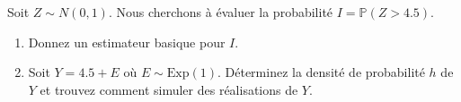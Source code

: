 \documentclass[11pt]{td_um}
\begin{document}
\begin{exo}{} %
    Soit $Z \sim N(0,1)$. Nous cherchons à évaluer la
    probabilité $I = \mathbb P(Z >4.5)$.
    \begin{enumerate}
        \item Donnez un estimateur basique pour $I$.
        \item Soit $Y = 4.5 + E$ où $E \sim \mbox{Exp}(1)$. Déterminez la
            densité de probabilité $h$ de $Y$ et trouvez comment simuler des
            réalisations de $Y$.
\end{enumerate}
\end{exo}
\end{document}
